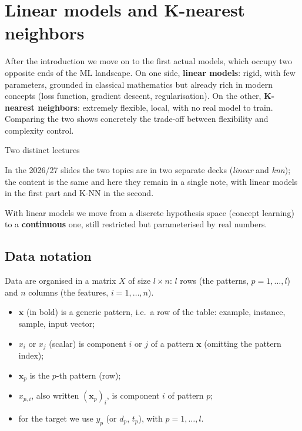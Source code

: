 \chapter{Linear models and K-nearest neighbors}\label{ch-05}

After the introduction we move on to the first actual models, which
occupy two opposite ends of the ML landscape. On one side,
\textbf{linear models}: rigid, with few parameters, grounded in
classical mathematics but already rich in modern concepts (loss
function, gradient descent, regularisation). On the other,
\textbf{K-nearest neighbors}: extremely flexible, local, with no real
model to train. Comparing the two shows concretely the trade-off
between flexibility and complexity control.

\begin{boxnote}{Two distinct lectures}

In the 2026/27 slides the two topics are in two separate decks
(\emph{linear} and \emph{knn}); the content is the same and here they
remain in a single note, with linear models in the first part and K-NN
in the second.

\end{boxnote}

With linear models we move from a discrete hypothesis space (concept
learning) to a \textbf{continuous} one, still restricted but
parameterised by real numbers.

\section{Data notation}\label{notazione-sui-dati}

Data are organised in a matrix \(X\) of size \(l \times n\): \(l\) rows
(the patterns, \(p = 1,\dots,l\)) and \(n\) columns (the features,
\(i = 1,\dots,n\)).

\begin{itemize}
\tightlist
\item
  \(\mathbf{x}\) (in bold) is a generic pattern, i.e.\ a row of the
  table: example, instance, sample, input vector;
\item
  \(x_i\) or \(x_j\) (scalar) is component \(i\) or \(j\) of a pattern
  \(\mathbf{x}\) (omitting the pattern index);
\item
  \(\mathbf{x}_p\) is the \(p\)-th pattern (row);
\item
  \(x_{p,i}\), also written \((\mathbf{x}_p)_i\), is component \(i\) of
  pattern \(p\);
\item
  for the target we use \(y_p\) (or \(d_p\), \(t_p\)), with
  \(p = 1,\dots,l\).
\end{itemize}


